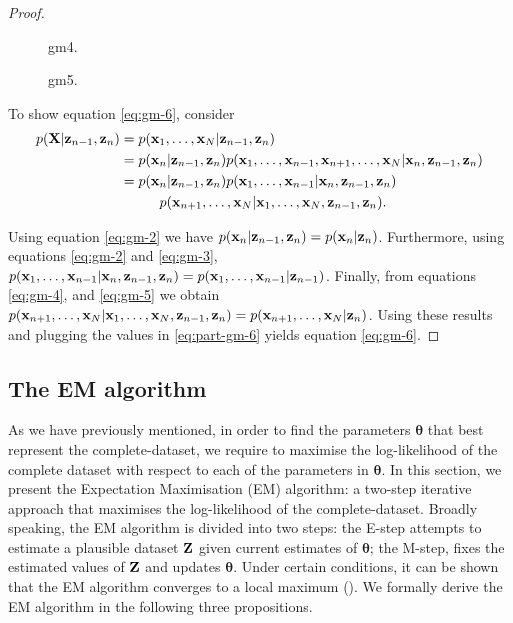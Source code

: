 \documentclass[11pt]{article}
\numberwithin{equation}{section}
\newcommand{\x}{{\bf x}}
\newcommand{\X}{{\bf X}}
\newcommand{\z}{{\bf z}}
\newcommand{\Z}{{\bf Z}}
\begin{document}
\begin{proof}
	\begin{figure}[h!]
		\centering
		\resizebox{\columnwidth}{!}{}
		\caption{gm4.}
		\label{fig:gm-4}
	\end{figure}
	
	\begin{figure}[h!]
		\centering
		\resizebox{\columnwidth}{!}{}
		\caption{gm5.}
		\label{fig:gm-5}
	\end{figure}
	
	To show equation \eqref{eq:gm-6}, consider
	\begin{align}
		p(\X \vert \z_{n-1}, \z_n) &= p(\x_1, \ldots, \x_N \vert \z_{n-1},\z_n)\\
		 &= p(\x_n \vert \z_{n-1}, \z_n) p(\x_1, \ldots, \x_{n-1}, \x_{n+1}, \ldots, \x_N \vert \x_n, \z_{n-1}, \z_n)\\
		&= p(\x_n \vert \z_{n-1}, \z_n) p(\x_1, \ldots, \x_{n-1} \vert \x_n, \z_{n-1}, \z_n) \nonumber\\
			&\hspace{1cm} p(\x_{n+1}, \ldots, \x_N \vert \x_1, \ldots, \x_N, \z_{n-1}, \z_n). \label{eq:part-gm-6}
	\end{align}
	
	Using equation \eqref{eq:gm-2} we have $p(\x_n \vert \z_{n-1}, \z_n) = p(\x_n \vert \z_n)$. Furthermore, using equations \eqref{eq:gm-2} and \eqref{eq:gm-3}, $p(\x_1, \ldots, \x_{n-1} \vert \x_n, \z_{n-1}, \z_n) = p(\x_1, \ldots, \x_{n-1} \vert \z_{n-1})$. Finally, from equations \eqref{eq:gm-4}, and \eqref{eq:gm-5} we obtain  $p(\x_{n+1}, \ldots, \x_N \vert \x_1, \ldots, \x_N, \z_{n-1}, \z_n) = p(\x_{n+1}, \ldots, \x_N \vert  \z_{n})$. Using these results and plugging the values in \eqref{eq:part-gm-6} yields equation \eqref{eq:gm-6}.
\end{proof}


\subsection{The EM algorithm}

As we have previously mentioned, in order to find the parameters $\boldsymbol{\theta}$ that best represent the complete-dataset, we require to maximise the log-likelihood of the complete dataset with respect to each of the parameters in $\boldsymbol{\theta}$. In this section, we present the Expectation Maximisation (EM) algorithm: a two-step iterative approach that maximises the log-likelihood of the complete-dataset. Broadly speaking, the EM algorithm is divided into two steps: the E-step attempts to estimate a plausible dataset $\Z$ given current estimates of $\boldsymbol\theta$; the M-step, fixes the estimated values of $\Z$ and updates $\boldsymbol{\theta}$. Under certain conditions, it can be shown that the EM algorithm converges to a local maximum (\cite{murphy2012}). We formally derive the EM algorithm in the following three propositions.
\end{document}
